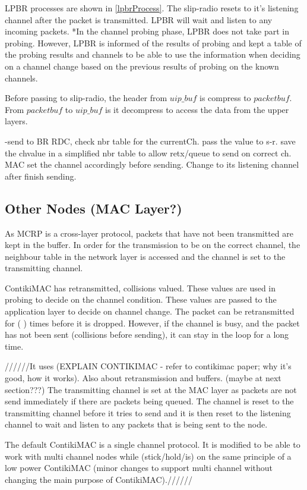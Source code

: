 LPBR processes are shown in \ref{lpbrProcess}.
The slip-radio resets to it's listening channel after the packet is transmitted. LPBR will wait and listen to any incoming packets. *In the channel probing phase, LPBR does not take part in probing. However, LPBR is informed of the results of probing and kept a table of the probing results and channels to be able to use the information when deciding on a channel change based on the previous results of probing on the known channels.

Before passing to slip-radio, the header from $uip\_buf$ is compress to $packetbuf$. From $packetbuf$ to $uip\_buf$ is it decompress to access the data from the upper layers.  

-send to BR RDC, check nbr table for the currentCh. pass the value to s-r. save the chvalue in a simplified nbr table to allow retx/queue to send on correct ch.
MAC set the channel accordingly before sending.
Change to its listening channel after finish sending. 

\subsection{Other Nodes (MAC Layer?)}
As MCRP is a cross-layer protocol, packets that have not been transmitted are kept in the buffer. In order for the transmission to be on the correct channel, the neighbour table in the network layer is accessed and the channel is set to the transmitting channel. 

ContikiMAC has retransmitted, collisions valued. These values are used in probing to decide on the channel condition. These values are passed to the application layer to decide on channel change. The packet can be retransmitted for ( ) times before it is dropped. However, if the channel is busy, and the packet has not been sent (collisions before sending), it can stay in the loop for a long time.

//////It uses (EXPLAIN CONTIKIMAC - refer to contikimac paper; why it's good, how it works). Also about retransmission and buffers. (maybe at next section???) The transmitting channel is set at the MAC layer as packets are not send immediately if there are packets being queued. The channel is reset to the transmitting channel before it tries to send and it is then reset to the listening channel to wait and listen to any packets that is being sent to the node. 

The default ContikiMAC is a single channel protocol. It is modified to be able to work with multi channel nodes while (stick/hold/is) on the same principle of a low power ContikiMAC (minor changes to support multi channel without changing the main purpose of ContikiMAC).//////

